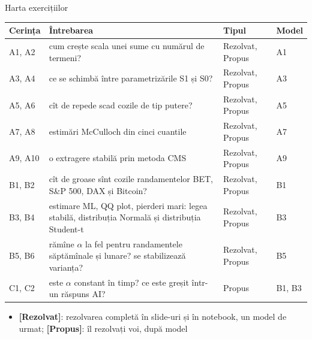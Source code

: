\begin{frame}{Harta exercițiilor}
\itemsize{\small}
\begin{center}
\footnotesize
\begin{tabular}{>{\raggedright\arraybackslash}p{1.1cm}>{\raggedright\arraybackslash}p{7.5cm}>{\raggedright\arraybackslash}p{1.9cm}>{\raggedright\arraybackslash}p{1.4cm}}
\toprule
\textbf{Cerința} & \textbf{Întrebarea} & \textbf{Tipul} & \textbf{Model} \\
\midrule
A1, A2 & cum crește scala unei sume cu numărul de termeni? & Rezolvat, Propus & A1 \\
A3, A4 & ce se schimbă între parametrizările S1 și S0? & Rezolvat, Propus & A3 \\
A5, A6 & cît de repede scad cozile de tip putere? & Rezolvat, Propus & A5 \\
A7, A8 & estimări McCulloch din cinci cuantile & Rezolvat, Propus & A7 \\
A9, A10 & o extragere stabilă prin metoda CMS & Rezolvat, Propus & A9 \\
B1, B2 & cît de groase sînt cozile randamentelor BET, S\&P 500, DAX și Bitcoin? & Rezolvat, Propus & B1 \\
B3, B4 & estimare ML, QQ plot, pierderi mari: legea stabilă, distribuția Normală și distribuția Student-t & Rezolvat, Propus & B3 \\
B5, B6 & rămîne $\alpha$ la fel pentru randamentele săptămînale și lunare? se stabilizează varianța? & Rezolvat, Propus & B5 \\
C1, C2 & este $\alpha$ constant în timp? ce este greșit într-un răspuns AI? & Propus & B1, B3 \\
\bottomrule
\end{tabular}
\end{center}
\begin{itemize}
    \item \textbf{[Rezolvat]}: rezolvarea completă în slide-uri și în notebook, un model de urmat; \textbf{[Propus]}: îl rezolvați voi, după model
\end{itemize}
\end{frame}

